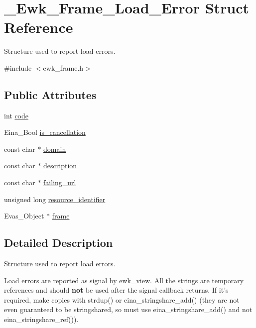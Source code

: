 \hypertarget{struct__Ewk__Frame__Load__Error}{\section{\+\_\+\+Ewk\+\_\+\+Frame\+\_\+\+Load\+\_\+\+Error Struct Reference}
\label{struct__Ewk__Frame__Load__Error}
}


Structure used to report load errors.  




{\ttfamily \#include $<$ewk\+\_\+frame.\+h$>$}

\subsection*{Public Attributes}
\begin{DoxyCompactItemize}
\item 
int \hyperlink{struct__Ewk__Frame__Load__Error_a15be8c88263d19ad8671c037f69914a5}{code}
\item 
Eina\+\_\+\+Bool \hyperlink{struct__Ewk__Frame__Load__Error_a4a0b006829bd4c47d146aaa248e5bf00}{is\+\_\+cancellation}
\item 
const char $\ast$ \hyperlink{struct__Ewk__Frame__Load__Error_acced5cec39060d9e982a6b777b1fffea}{domain}
\item 
const char $\ast$ \hyperlink{struct__Ewk__Frame__Load__Error_aa60f960a10b3296d6d22f75857f3232d}{description}
\item 
const char $\ast$ \hyperlink{struct__Ewk__Frame__Load__Error_a56036e422a54ec3329cef5120b3cde52}{failing\+\_\+url}
\item 
unsigned long \hyperlink{struct__Ewk__Frame__Load__Error_abe4b75c6837e5286e6ce93e5faa4f1f7}{resource\+\_\+identifier}
\item 
Evas\+\_\+\+Object $\ast$ \hyperlink{struct__Ewk__Frame__Load__Error_aa95d535f8e3ae79ee2869fdd410d6db3}{frame}
\end{DoxyCompactItemize}


\subsection{Detailed Description}
Structure used to report load errors. 

Load errors are reported as signal by ewk\+\_\+view. All the strings are temporary references and should {\bfseries not} be used after the signal callback returns. If it's required, make copies with strdup() or eina\+\_\+stringshare\+\_\+add() (they are not even guaranteed to be stringshared, so must use eina\+\_\+stringshare\+\_\+add() and not eina\+\_\+stringshare\+\_\+ref()). 


